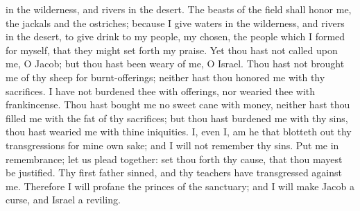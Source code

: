 in the wilderness, and rivers in the desert. The beasts of the field shall honor me, the jackals and the ostriches; because I give waters in the wilderness, and rivers in the desert, to give drink to my people, my chosen, the people which I formed for myself, that they might set forth my praise.  Yet thou hast not called upon me, O Jacob; but thou hast been weary of me, O Israel. Thou hast not brought me of thy sheep for burnt-offerings; neither hast thou honored me with thy sacrifices. I have not burdened thee with offerings, nor wearied thee with frankincense. Thou hast bought me no sweet cane with money, neither hast thou filled me with the fat of thy sacrifices; but thou hast burdened me with thy sins, thou hast wearied me with thine iniquities.  I, even I, am he that blotteth out thy transgressions for mine own sake; and I will not remember thy sins. Put me in remembrance; let us plead together: set thou forth thy cause, that thou mayest be justified. Thy first father sinned, and thy teachers have transgressed against me. Therefore I will profane the princes of the sanctuary; and I will make Jacob a curse, and Israel a reviling. 

